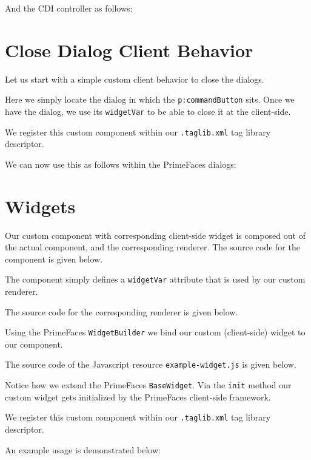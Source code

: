 And the CDI controller as follows:


\section{Close Dialog Client Behavior}
Let us start with a simple custom client behavior to close the dialogs.

Here we simply locate the dialog in which the \texttt{p:commandButton} sits.
Once we have the dialog, we use its \texttt{widgetVar} to be able to close it at the client-side.

We register this custom component within our \texttt{.taglib.xml} tag library descriptor.


We can now use this as follows within the PrimeFaces dialogs:



\section{Widgets}
Our custom component with corresponding client-side widget is composed out of the actual component, and the corresponding renderer.
The source code for the component is given below.

The component simply defines a \texttt{widgetVar} attribute that is used by our custom renderer.

The source code for the corresponding renderer is given below.

Using the PrimeFaces \texttt{WidgetBuilder} we bind our custom (client-side) widget to our component.

The source code of the Javascript resource \texttt{example-widget.js} is given below.

Notice how we extend the PrimeFaces \texttt{BaseWidget}. Via the \texttt{init} method our custom widget gets initialized by the PrimeFaces client-side framework.

We register this custom component within our \texttt{.taglib.xml} tag library descriptor.


An example usage is demonstrated below:
